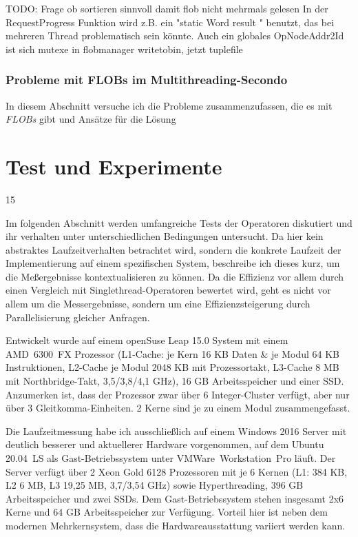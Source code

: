 \documentclass[a4paper,12pt,twoside]{article}
\newcommand{\Fb}[1]{\textit{#1}} %
\begin{document}
{TODO: Frage ob sortieren sinnvoll damit flob nicht mehrmals gelesen
In der RequestProgress Funktion wird z.B. ein "static Word result " benutzt, das bei mehreren Thread problematisch sein könnte. 
Auch ein globales OpNodeAddr2Id ist sich
mutexe in flobmanager
writetobin, jetzt tuplefile

\subsubsection{Probleme mit FLOBs im Multithreading-Secondo}

In diesem Abschnitt versuche ich die Probleme zusammenzufassen, die es mit \Fb{FLOBs} gibt und Ansätze für die Lösung 

\section{Test und Experimente} 15 
\label{te}

Im folgenden Abschnitt werden umfangreiche Tests der Operatoren diskutiert und ihr verhalten unter unterschiedlichen Bedingungen untersucht. Da hier kein abstraktes Laufzeitverhalten betrachtet wird, sondern die konkrete Laufzeit der Implementierung auf einem spezifischen System, beschreibe ich dieses kurz, um die Meßergebnisse kontextualisieren zu können. Da die Effizienz vor allem durch einen Vergleich mit Singlethread-Operatoren bewertet wird, geht es nicht vor allem um die Messergebnisse, sondern um eine Effizienzsteigerung durch Parallelisierung gleicher Anfragen. 

Entwickelt wurde auf einem openSuse Leap 15.0 System mit einem AMD~6300~FX Prozessor (L1-Cache: je Kern 16 KB Daten \& je Modul 64 KB Instruktionen, L2-Cache je Modul 2048 KB mit Prozessortakt, L3-Cache 8 MB mit Northbridge-Takt, 3,5/3,8/4,1 GHz), 16 GB Arbeitsspeicher und einer SSD. Anzumerken ist, dass der Prozessor zwar über
6 Integer-Cluster verfügt, aber nur über 3 Gleitkomma-Einheiten. 2 Kerne sind je zu einem Modul zusammengefasst.

Die Laufzeitmessung  habe ich ausschließlich auf einem Windows 2016 Server mit deutlich besserer und aktuellerer Hardware vorgenommen, auf dem Ubuntu 20.04~LS als Gast-Betriebssystem unter VMWare~Workstation~Pro läuft. Der Server verfügt über 2 Xeon Gold 6128 Prozessoren mit je 6 Kernen (L1: 384 KB, L2 6 MB, L3 19,25 MB, 3,7/3,54 GHz) sowie Hyperthreading, 396 GB Arbeitsspeicher und zwei SSDs. Dem Gast-Betriebssystem stehen insgesamt 2x6 Kerne und 64 GB Arbeitsspeicher zur Verfügung. Vorteil hier ist neben dem modernen Mehrkernsystem, dass die Hardwareausstattung variiert werden kann.  

}
\end{document}
